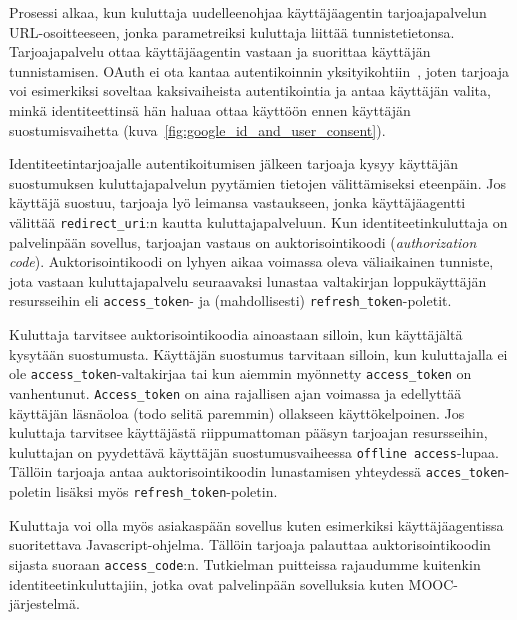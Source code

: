 \documentclass[finnish,gradu]{tktltiki}
\begin{document}
  Prosessi alkaa, kun kuluttaja uudelleenohjaa käyttäjäagentin tarjoajapalvelun URL-osoitteeseen, jonka parametreiksi kuluttaja liittää tunnistetietonsa. Tarjoajapalvelu ottaa käyttäjäagentin vastaan ja suorittaa käyttäjän tunnistamisen. OAuth ei ota kantaa autentikoinnin yksityikohtiin~\cite{ietf_oauth2}, joten tarjoaja voi esimerkiksi soveltaa kaksivaiheista autentikointia ja antaa käyttäjän valita, minkä identiteettinsä hän haluaa ottaa käyttöön ennen käyttäjän suostumisvaihetta (kuva~\ref{fig:google_id_and_user_consent}).

  Identiteetintarjoajalle autentikoitumisen jälkeen tarjoaja kysyy käyttäjän suostumuksen kuluttajapalvelun pyytämien tietojen välittämiseksi eteenpäin. Jos käyttäjä suostuu, tarjoaja lyö leimansa vastaukseen, jonka käyttäjäagentti välittää \verb!redirect_uri!:n kautta kuluttajapalveluun. Kun identiteetinkuluttaja on palvelinpään sovellus, tarjoajan vastaus on auktorisointikoodi (\emph{authorization code}). Auktorisointikoodi on lyhyen aikaa voimassa oleva väliaikainen tunniste, jota vastaan kuluttajapalvelu seuraavaksi lunastaa valtakirjan loppukäyttäjän resursseihin eli \verb!access_token!- ja (mahdollisesti) \verb!refresh_token!-poletit.

  Kuluttaja tarvitsee auktorisointikoodia ainoastaan silloin, kun käyttäjältä kysytään suostumusta. Käyttäjän suostumus tarvitaan silloin, kun kuluttajalla ei ole \verb!access_token!-valtakirjaa tai kun aiemmin myönnetty \verb!access_token! on vanhentunut. \verb!Access_token! on aina rajallisen ajan voimassa ja edellyttää käyttäjän läsnäoloa (todo selitä paremmin) ollakseen käyttökelpoinen. Jos kuluttaja tarvitsee käyttäjästä riippumattoman pääsyn tarjoajan resursseihin, kuluttajan on pyydettävä käyttäjän suostumusvaiheessa \verb!offline access!-lupaa. Tällöin tarjoaja antaa auktorisointikoodin lunastamisen yhteydessä \verb!acces_token!-poletin lisäksi myös \verb!refresh_token!-poletin.

  Kuluttaja voi olla myös asiakaspään sovellus kuten esimerkiksi käyttäjäagentissa suoritettava Javascript-ohjelma. Tällöin tarjoaja palauttaa auktorisointikoodin sijasta suoraan \verb!access_code!:n. Tutkielman puitteissa rajaudumme kuitenkin identiteetinkuluttajiin, jotka ovat palvelinpään sovelluksia kuten MOOC-järjestelmä.




\end{document}
